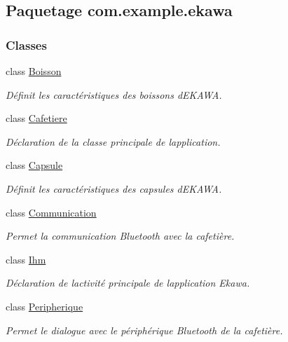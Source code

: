 \hypertarget{namespacecom_1_1example_1_1ekawa}{}\subsection{Paquetage com.\+example.\+ekawa}
\label{namespacecom_1_1example_1_1ekawa}
\subsubsection*{Classes}
\begin{DoxyCompactItemize}
\item 
class \hyperlink{classcom_1_1example_1_1ekawa_1_1_boisson}{Boisson}
\begin{DoxyCompactList}\small\item\em Définit les caractéristiques des boissons d\textquotesingle{}E\+K\+A\+WA. \end{DoxyCompactList}\item 
class \hyperlink{classcom_1_1example_1_1ekawa_1_1_cafetiere}{Cafetiere}
\begin{DoxyCompactList}\small\item\em Déclaration de la classe principale de l\textquotesingle{}application. \end{DoxyCompactList}\item 
class \hyperlink{classcom_1_1example_1_1ekawa_1_1_capsule}{Capsule}
\begin{DoxyCompactList}\small\item\em Définit les caractéristiques des capsules d\textquotesingle{}E\+K\+A\+WA. \end{DoxyCompactList}\item 
class \hyperlink{classcom_1_1example_1_1ekawa_1_1_communication}{Communication}
\begin{DoxyCompactList}\small\item\em Permet la communication Bluetooth avec la cafetière. \end{DoxyCompactList}\item 
class \hyperlink{classcom_1_1example_1_1ekawa_1_1_ihm}{Ihm}
\begin{DoxyCompactList}\small\item\em Déclaration de l\textquotesingle{}activité principale de l\textquotesingle{}application Ekawa. \end{DoxyCompactList}\item 
class \hyperlink{classcom_1_1example_1_1ekawa_1_1_peripherique}{Peripherique}
\begin{DoxyCompactList}\small\item\em Permet le dialogue avec le périphérique Bluetooth de la cafetière. \end{DoxyCompactList}\item 

\end{DoxyCompactItemize}
